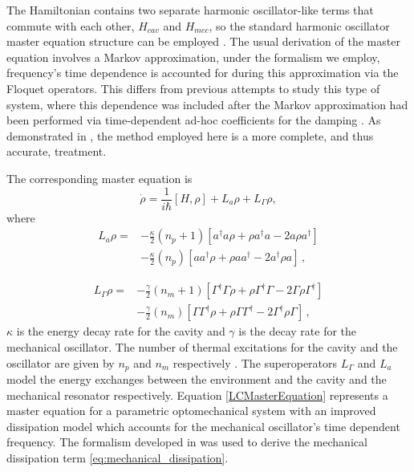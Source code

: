 \documentclass[reprint, amsmath,amssymb, aps,pra]{revtex4-1}
\begin{document}
The Hamiltonian contains two separate harmonic oscillator-like terms
that commute with each other, $H_{cav}$ and $H_{mec}$, so the standard
harmonic oscillator master equation structure can be employed
\cite{TesisMaestria}\cite{HanngiFM}. The usual derivation of the master
equation involves a Markov approximation, under the formalism we
employ, frequency's time dependence is accounted for during this
approximation \cite{HanngiFM} via the Floquet operators. This differs
from previous attempts to study this type of system, where this
dependence was included after the Markov approximation had been
performed via time-dependent ad-hoc coefficients for the damping
\cite{BarberisLC}. As demonstrated in \cite{HanngiFM}, the method
employed here is a more complete, and thus accurate, treatment.

The corresponding master equation is
\begin{equation} \label{LCMasterEquation}
\dot{\rho} = \frac{1}{i\hbar}[H,\rho] +L_a\rho + L_\Gamma \rho,
\end{equation}
where
\begin{align}
L_a \rho =& - \frac{\kappa}{2}(n_p + 1)[a^\dagger a\rho + \rho a^\dagger a -2a\rho a^\dagger]  \\
 &- \frac{\kappa}{2}(n_p)[ aa^\dagger\rho + \rho  aa^\dagger -2a^\dagger\rho a]\, ,\nonumber
\end{align}

\begin{align}\label{eq:mechanical_dissipation}
  L_\Gamma \rho =& - \frac{\gamma}{2}(n_m + 1)[\Gamma^\dagger \Gamma\rho + \rho \Gamma^\dagger \Gamma -2\Gamma\rho \Gamma^\dagger]  \\
                 &- \frac{\gamma}{2}(n_m)[ \Gamma\Gamma^\dagger\rho + \rho  \Gamma\Gamma^\dagger -2\Gamma^\dagger\rho \Gamma]\, ,\nonumber
\end{align} 
$\kappa$ is the energy decay rate for the cavity and $\gamma$ is the
decay rate for the mechanical oscillator. The number of thermal
excitations for the cavity and the oscillator are given by $n_p$ and
$n_m$ respectively \cite{EnglertFL}. The superoperators $L_\Gamma$ and
$L_a$ model the energy exchanges between the environment and the
cavity and the mechanical resonator respectively. Equation
\eqref{LCMasterEquation} represents a master equation for a parametric
optomechanical system with an improved dissipation model which
accounts for the mechanical oscillator's time dependent frequency. The
formalism developed in \cite{HanngiFM} was used to derive the
mechanical dissipation term \eqref{eq:mechanical_dissipation}.
\end{document}
